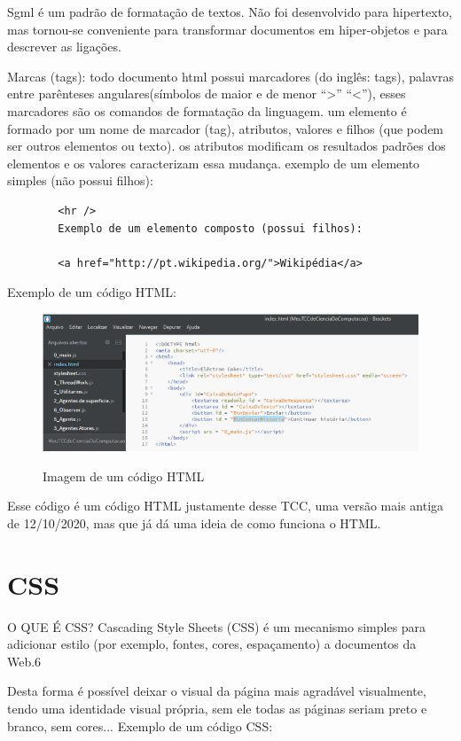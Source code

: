 	Sgml é um padrão de formatação de textos. Não foi desenvolvido para hipertexto, mas tornou-se  conveniente para transformar documentos em hiper-objetos e para descrever as ligações.
	\cite{carr1994use}
	
	Marcas (tags): todo documento html possui marcadores (do inglês: tags), palavras entre parênteses angulares(símbolos de maior e de menor “>” “<”), esses marcadores são os comandos de formatação da linguagem. um elemento é formado por um nome de marcador (tag), atributos, valores e filhos (que podem ser outros elementos ou texto). os atributos modificam os resultados padrões dos elementos e os valores caracterizam essa mudança. exemplo de um elemento simples (não possui filhos): 
	
	\begin{verbatim}	
		<hr /> 
		Exemplo de um elemento composto (possui filhos): 
		
		<a href="http://pt.wikipedia.org/">Wikipédia</a> 	
	\end{verbatim}
	Exemplo de um código HTML:		
	\begin{figure}[H]
		\centering
		\caption{Imagem de um código HTML}
		\centering
		\includegraphics[scale=0.75]{./images/Figure_5}	
		\label{fig:Fig5} 
	\end{figure}	
	Esse código é um código HTML justamente desse TCC, uma versão mais antiga de 12/10/2020, mas que já dá uma ideia de como funciona o HTML.
	
\section{CSS}
\label{sec:CSS}

O QUE É CSS? Cascading Style Sheets (CSS) é um mecanismo simples para adicionar estilo (por exemplo, fontes, cores, espaçamento) a documentos da Web.6 

Desta forma é possível deixar o visual da página mais agradável visualmente, tendo uma identidade visual própria, sem ele todas as páginas seriam preto e branco, sem cores... 
Exemplo de um código CSS: 

